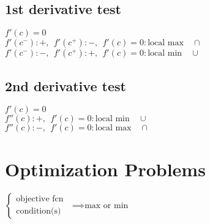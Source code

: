 \subsection*{1st derivative test}
$f'(c) = 0$\\
$f'(c^-): +,  \ \ f'(c^+): -, \ \ f'(c) = 0: \text{local max} \quad \cap$\\
$f'(c^-): -, \ \ f'(c^+): +, \ \ f'(c) = 0: \text{local min} \quad \cup$
\subsection*{2nd derivative test}
$f'(c)= 0$\\
$f''(c): +, \ \ f'(c)= 0: \text{local min} \quad \cup$\\
$f''(c): -, \ \ f'(c) = 0: \text{local max} \quad \cap$
\section{Optimization Problems}
$\left \{ \begin{array}{ll}
\text{objective fcn}\\
\text{condition(s)}
\end{array}
\right.$
$\implies \text{max or min}$\\\\
